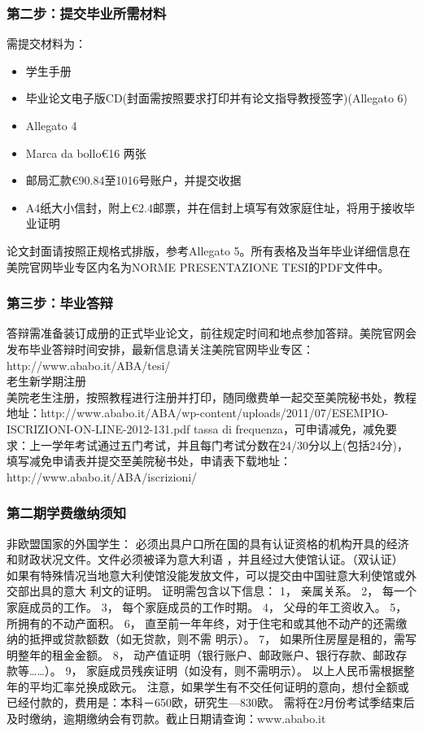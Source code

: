 \documentclass[3pt,a5paper,openright,twoside]{book}
\begin{document}
\subsubsection{第二步：提交毕业所需材料}
需提交材料为：
\begin{itemize}
  \item 学生手册
  \item 毕业论文电子版CD(封面需按照要求打印并有论文指导教授签字)(Allegato 6)
  \item Allegato 4
  \item Marca da bollo€16 两张
  \item 邮局汇款€90.84至1016号账户，并提交收据
  \item A4纸大小信封，附上€2.4邮票，并在信封上填写有效家庭住址，将用于接收毕业证明
\end{itemize}
论文封面请按照正规格式排版，参考Allegato 5。所有表格及当年毕业详细信息在美院官网毕业专区内名为NORME PRESENTAZIONE TESI的PDF文件中。


\subsubsection{第三步：毕业答辩}
答辩需准备装订成册的正式毕业论文，前往规定时间和地点参加答辩。美院官网会发布毕业答辩时间安排，最新信息请关注美院官网毕业专区：http://www.ababo.it/ABA/tesi/\\


老生新学期注册\\
美院老生注册，按照教程进行注册并打印，随同缴费单一起交至美院秘书处，教程地址：http://www.ababo.it/ABA/wp-content/uploads/2011/07/ESEMPIO-ISCRIZIONI-ON-LINE-2012-131.pdf
tassa di frequenza，可申请减免，减免要求：上一学年考试通过五门考试，并且每门考试分数在24/30分以上(包括24分)，填写减免申请表并提交至美院秘书处，申请表下载地址：http://www.ababo.it/ABA/iscrizioni/

\subsubsection{第二期学费缴纳须知}
非欧盟国家的外国学生： 必须出具户口所在国的具有认证资格的机构开具的经济和财政状况文件。文件必须被译为意大利语 ，并且经过大使馆认证。（双认证） 如果有特殊情况当地意大利使馆没能发放文件，可以提交由中国驻意大利使馆或外交部出具的意大 利文的证明。 证明需包含以下信息： 1， 亲属关系。 2， 每一个家庭成员的工作。 3， 每个家庭成员的工作时期。 4， 父母的年工资收入。 5， 所拥有的不动产面积。 6， 直至前一年年终，对于住宅和或其他不动产的还需缴纳的抵押或贷款额数（如无贷款，则不需 明示）。 7， 如果所住房屋是租的，需写明整年的租金金额。 8， 动产值证明（银行账户、邮政账户、银行存款、邮政存款等……）。 9， 家庭成员残疾证明（如没有，则不需明示）。 以上人民币需根据整年的平均汇率兑换成欧元。 注意，如果学生有不交任何证明的意向，想付全额或已经付款的，费用是：本科－650欧，研究生—830欧。 需将在2月份考试季结束后及时缴纳，逾期缴纳会有罚款。截止日期请查询：www.ababo.it
\end{document}
